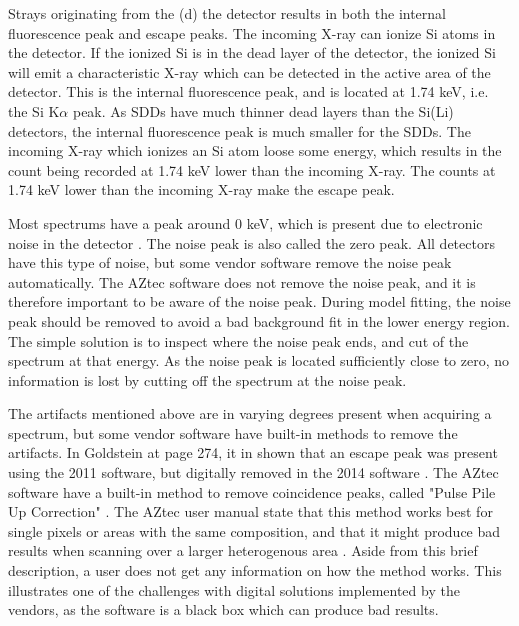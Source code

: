 Strays originating from the (d) the detector results in both the internal fluorescence peak and escape peaks.
The incoming X-ray can ionize Si atoms in the detector.
If the ionized Si is in the dead layer of the detector, the ionized Si will emit a characteristic X-ray which can be detected in the active area of the detector.
This is the internal fluorescence peak, and is located at 1.74 keV, i.e. the Si K$\alpha$ peak.
As SDDs have much thinner dead layers than the Si(Li) detectors, the internal fluorescence peak is much smaller for the SDDs.
The incoming X-ray which ionizes an Si atom loose some energy, which results in the count being recorded at 1.74 keV lower than the incoming X-ray.
The counts at 1.74 keV lower than the incoming X-ray make the escape peak.


Most spectrums have a peak around 0 keV, which is present due to electronic noise in the detector \cite{aztec_manual}.
The noise peak is also called the zero peak.
All detectors have this type of noise, but some vendor software remove the noise peak automatically.
The AZtec software does not remove the noise peak, and it is therefore important to be aware of the noise peak.
During model fitting, the noise peak should be removed to avoid a bad background fit in the lower energy region.
The simple solution is to inspect where the noise peak ends, and cut of the spectrum at that energy.
As the noise peak is located sufficiently close to zero, no information is lost by cutting off the spectrum at the noise peak.



The artifacts mentioned above are in varying degrees present when acquiring a spectrum, but some vendor software have built-in methods to remove the artifacts.
In Goldstein at page 274, it in shown that an escape peak was present using the 2011 software, but digitally removed in the 2014 software \cite[Fig. 18.7]{goldstein_scanning_2018}.
The AZtec software have a built-in method to remove coincidence peaks, called "Pulse Pile Up Correction" \cite{aztec_manual}.
The AZtec user manual state that this method works best for single pixels or areas with the same composition, and that it might produce bad results when scanning over a larger heterogenous area \cite[p. 99]{aztec_manual}.
Aside from this brief description, a user does not get any information on how the method works.
This illustrates one of the challenges with digital solutions implemented by the vendors, as the software is a black box which can produce bad results.




